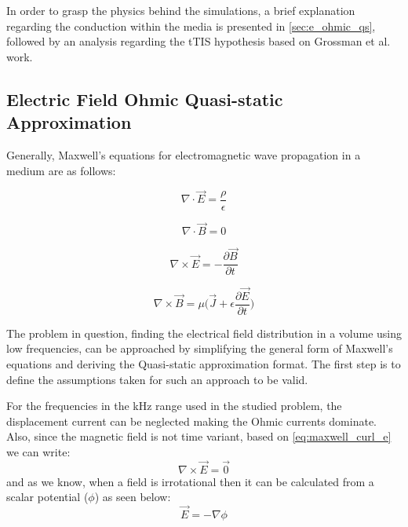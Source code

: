 In order to grasp the physics behind the simulations, a brief explanation regarding the conduction within the media is presented in \autoref{sec:e_ohmic_qs}, followed by an analysis regarding the \gls{tTIS} hypothesis based on Grossman et al.\cite{Grossman2017} work.

\subsection{Electric Field Ohmic Quasi-static Approximation}
\label{sec:e_ohmic_qs}

Generally, Maxwell's equations for electromagnetic wave propagation in a medium are as follows:
\begin{center}
\begin{minipage}{.35\linewidth}
    \begin{equation}
        \nabla\cdot\vec{E}=\dfrac{\rho}{\epsilon}
    \end{equation}
\end{minipage}
\begin{minipage}{.35\linewidth}
    \begin{equation}
        \nabla\cdot\vec{B} = 0
    \end{equation}
\end{minipage}\break
\begin{minipage}{.35\linewidth}
    \begin{equation}
        \label{eq:maxwell_curl_e}
        \nabla\times\vec{E}=-\dfrac{\partial\vec{B}}{\partial t}
    \end{equation}
\end{minipage}
\begin{minipage}{.35\linewidth}
    \begin{equation}
        \nabla\times\vec{B} = \mu\Bigg(\vec{J} + \epsilon\dfrac{\partial\vec{E}}{\partial t}\Bigg)
    \end{equation}
\end{minipage}
\end{center}

\noindent The problem in question, finding the electrical field distribution in a volume using low frequencies, can be approached by simplifying the general form of Maxwell's equations and deriving the Quasi-static approximation format. The first step is to define the assumptions taken for such an approach to be valid.

For the frequencies in the \si{kHz} range used in the studied problem, the displacement current can be neglected making the Ohmic currents dominate. Also, since the magnetic field is not time variant, based on \autoref{eq:maxwell_curl_e} we can write:
\begin{equation}
    \label{eq:curl_zero_e_field}
    \nabla\times\vec{E} = \vec{0}
\end{equation}
and as we know, when a field is irrotational then it can be calculated from a scalar potential ($\phi$) as seen below:
\begin{equation}
    \label{eq:e_field_from_potential}
    \boxed{\vec{E} = -\nabla\phi}
\end{equation}


